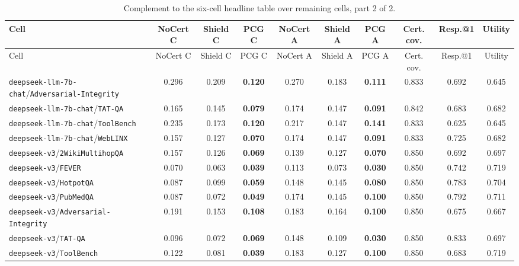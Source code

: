 
\begin{longtable}{l|ccc|ccc|ccc}
\caption{\footnotesize Complement to the six-cell headline table over remaining cells, part 2 of 2.}\label{tab:appendix_remaining_50_summary_2}\\
\toprule
Cell & NoCert C & Shield C & PCG C & NoCert A & Shield A & PCG A & Cert. cov. & Resp.@1 & Utility \\
\midrule
\endfirsthead
\toprule
Cell & NoCert C & Shield C & PCG C & NoCert A & Shield A & PCG A & Cert. cov. & Resp.@1 & Utility \\
\midrule
\endhead
\texttt{deepseek-llm-7b-chat}/\texttt{Adversarial-Integrity} & 0.296 & 0.209 & \textbf{0.120} & 0.270 & 0.183 & \textbf{0.111} & 0.833 & 0.692 & 0.645 \\
\texttt{deepseek-llm-7b-chat}/\texttt{TAT-QA} & 0.165 & 0.145 & \textbf{0.079} & 0.174 & 0.147 & \textbf{0.091} & 0.842 & 0.683 & 0.682 \\
\texttt{deepseek-llm-7b-chat}/\texttt{ToolBench} & 0.235 & 0.173 & \textbf{0.120} & 0.217 & 0.147 & \textbf{0.141} & 0.833 & 0.625 & 0.645 \\
\texttt{deepseek-llm-7b-chat}/\texttt{WebLINX} & 0.157 & 0.127 & \textbf{0.070} & 0.174 & 0.147 & \textbf{0.091} & 0.833 & 0.725 & 0.682 \\
\texttt{deepseek-v3}/\texttt{2WikiMultihopQA} & 0.157 & 0.126 & \textbf{0.069} & 0.139 & 0.127 & \textbf{0.070} & 0.850 & 0.692 & 0.697 \\
\texttt{deepseek-v3}/\texttt{FEVER} & 0.070 & 0.063 & \textbf{0.039} & 0.113 & 0.073 & \textbf{0.030} & 0.850 & 0.742 & 0.719 \\
\texttt{deepseek-v3}/\texttt{HotpotQA} & 0.087 & 0.099 & \textbf{0.059} & 0.148 & 0.145 & \textbf{0.080} & 0.850 & 0.783 & 0.704 \\
\texttt{deepseek-v3}/\texttt{PubMedQA} & 0.087 & 0.072 & \textbf{0.049} & 0.174 & 0.145 & \textbf{0.100} & 0.850 & 0.792 & 0.711 \\
\texttt{deepseek-v3}/\texttt{Adversarial-Integrity} & 0.191 & 0.153 & \textbf{0.108} & 0.183 & 0.164 & \textbf{0.100} & 0.850 & 0.675 & 0.667 \\
\texttt{deepseek-v3}/\texttt{TAT-QA} & 0.096 & 0.072 & \textbf{0.069} & 0.148 & 0.109 & \textbf{0.030} & 0.850 & 0.833 & 0.697 \\
\texttt{deepseek-v3}/\texttt{ToolBench} & 0.122 & 0.081 & \textbf{0.039} & 0.183 & 0.127 & \textbf{0.100} & 0.850 & 0.683 & 0.719 \\

\end{longtable}
